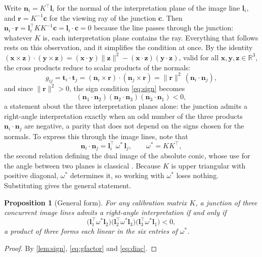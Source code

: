 \documentclass[pdflatex,sn-mathphys-num,iicol]{sn-jnl}
\newcommand{\vr}{\mathbf{r}}
\newcommand{\vt}{\mathbf{t}}
\newcommand{\vn}{\mathbf{n}}
\newcommand{\vl}{\mathbf{l}}
\newcommand{\vc}{\mathbf{c}}
\theoremstyle{thmstyleone}
\newtheorem{proposition}[theorem]{Proposition}
\theoremstyle{thmstylethree}
\theoremstyle{thmstyletwo}
\begin{document}
Write $\vn_i=K^{\top}\vl_i$ for the normal of the interpretation plane of the image line $\vl_i$, and $\vr=K^{-1}\vc$ for the viewing ray of the junction $\vc$. Then $\vn_i\cdot\vr=\vl_i^{\top}KK^{-1}\vc=\vl_i\cdot\vc=0$ because the line passes through the junction: whatever $K$ is, each interpretation plane contains the ray. Everything that follows rests on this observation, and it simplifies the condition at once. By the identity $(\mathbf{x}\times\mathbf{z})\cdot(\mathbf{y}\times\mathbf{z})=(\mathbf{x}\cdot\mathbf{y})\|\mathbf{z}\|^2-(\mathbf{x}\cdot\mathbf{z})(\mathbf{y}\cdot\mathbf{z})$, valid for all $\mathbf{x},\mathbf{y},\mathbf{z}\in\mathbb{R}^3$, the cross products reduce to scalar products of the normals:
\begin{equation}
g_{ij}=\vt_i\cdot\vt_j=(\vn_i\times\vr)\cdot(\vn_j\times\vr)=\|\vr\|^2\,(\vn_i\cdot\vn_j),
\label{eq:gfactor}
\end{equation}
and since $\|\vr\|^2>0$, the sign condition \eqref{eq:sign} becomes
\begin{equation}
(\vn_1\cdot\vn_2)(\vn_2\cdot\vn_3)(\vn_3\cdot\vn_1)<0 ,
\label{eq:planes}
\end{equation}
a statement about the three interpretation planes alone: the junction admits a right-angle interpretation exactly when an odd number of the three products $\vn_i\cdot\vn_j$ are negative, a parity that does not depend on the signs chosen for the normals. To express this through the image lines, note that
\begin{equation}
\vn_i\cdot\vn_j=\vl_i^{\top}\,\omega^{*}\,\vl_j,\qquad \omega^{*}=KK^{\top},
\label{eq:diac}
\end{equation}
the second relation defining the dual image of the absolute conic, whose use for the angle between two planes is classical \citep{triggs1997,hartley2004}. Because $K$ is upper triangular with positive diagonal, $\omega^{*}$ determines it, so working with $\omega^{*}$ loses nothing. Substituting gives the general statement.

\begin{proposition}[General form]\label{prop:general}
For any calibration matrix $K$, a junction of three concurrent image lines admits a right-angle interpretation if and only if
\[
\bigl(\vl_1^{\top}\omega^{*}\vl_2\bigr)\bigl(\vl_2^{\top}\omega^{*}\vl_3\bigr)\bigl(\vl_3^{\top}\omega^{*}\vl_1\bigr)<0 ,
\]
a product of three forms each \emph{linear} in the six entries of $\omega^{*}$.
\end{proposition}
\begin{proof}
By \cref{lem:sign}, \eqref{eq:gfactor} and \eqref{eq:diac}.
\end{proof}
\end{document}

